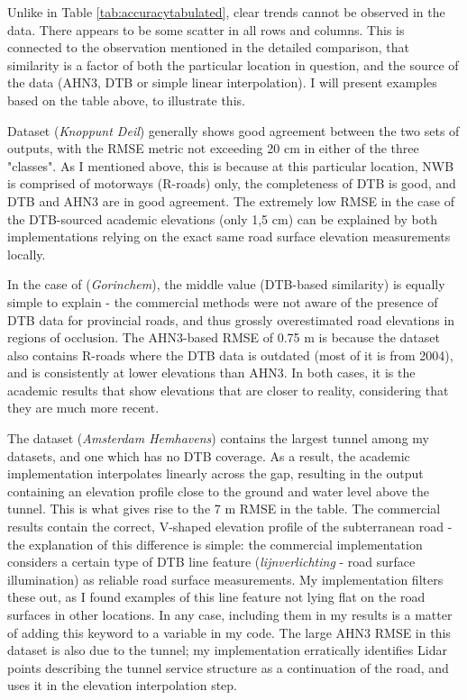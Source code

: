 Unlike in Table \ref{tab:accuracytabulated}, clear trends cannot be observed in the data. There appears to be some scatter in all rows and columns. This is connected to the observation mentioned in the detailed comparison, that similarity is a factor of both the particular location in question, and the source of the data (AHN3, DTB or simple linear interpolation). I will present examples based on the table above, to illustrate this.

Dataset  (\textit{Knoppunt Deil}) generally shows good agreement between the two sets of outputs, with the RMSE metric not exceeding 20 cm in either of the three "classes". As I mentioned above, this is because at this particular location, NWB is comprised of motorways (R-roads) only, the completeness of DTB is good, and DTB and AHN3 are in good agreement. The extremely low RMSE in the case of the DTB-sourced academic elevations (only 1,5 cm) can be explained by both implementations relying on the exact same road surface elevation measurements locally.

In the case of  (\textit{Gorinchem}), the middle value (DTB-based similarity) is equally simple to explain - the commercial methods were not aware of the presence of DTB data for provincial roads, and thus grossly overestimated road elevations in regions of occlusion. The AHN3-based RMSE of 0.75 m is because the dataset also contains R-roads where the DTB data is outdated (most of it is from 2004), and is consistently at lower elevations than AHN3. In both cases, it is the academic results that show elevations that are closer to reality, considering that they are much more recent.

The dataset  (\textit{Amsterdam Hemhavens}) contains the largest tunnel among my datasets, and one which has no DTB coverage. As a result, the academic implementation interpolates linearly across the gap, resulting in the output containing an elevation profile close to the ground and water level above the tunnel. This is what gives rise to the 7 m RMSE in the table. The commercial results contain the correct, V-shaped elevation profile of the subterranean road - the explanation of this difference is simple: the commercial implementation considers a certain type of DTB line feature (\textit{lijnverlichting} - road surface illumination) as reliable road surface measurements. My implementation filters these out, as I found examples of this line feature not lying flat on the road surfaces in other locations. In any case, including them in my results is a matter of adding this keyword to a variable in my code. The large AHN3 RMSE in this dataset is also due to the tunnel; my implementation erratically identifies Lidar points describing the tunnel service structure as a continuation of the road, and uses it in the elevation interpolation step.

